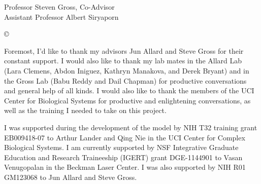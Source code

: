 




\othercommitteemembers
{
  Professor Steven Gross, Co-Advisor\\
  Assistant Professor Albert Siryaporn
}


\copyrightdeclaration
{
  {\copyright} {\Degreeyear} \Authorname
}


%  

\acknowledgments
{
Foremost, I'd like to thank my advisors Jun Allard and Steve Gross for their constant support. I would also like to thank my lab mates in the Allard Lab (Lara Clemens, Abdon Iniguez, Kathryn Manakova, and Derek Bryant) and in the Gross Lab (Babu Reddy and Dail Chapman) for productive conversations and general help of all kinds. I would also like to thank the members of the UCI Center for Biological Systems for productive and enlightening conversations, as well as the training I needed to take on this project.

I was supported during the development of the model by NIH T32 training grant EB009418-07 to Arthur Lander and Qing Nie in the UCI Center for Complex Biological Systems. I am currently supported by NSF Integrative Graduate Education and Research Traineeship (IGERT) grant DGE-1144901 to Vasan Venugopalan in the Beckman Laser Center. I was also supported by NIH R01 GM123068 to Jun Allard and Steve Gross.
}


